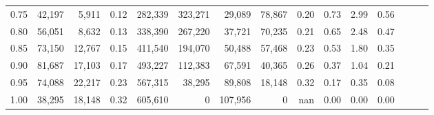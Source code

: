 \begin{tabular}{rrrrrrrrrrrrrrr}
0.75 &  42,197 &   5,911 &  0.12 &  282,339 &  323,271 &   29,089 &   78,867 &  0.20 &  0.73 &  2.99 &      0.56 \\
0.80 &  56,051 &   8,632 &  0.13 &  338,390 &  267,220 &   37,721 &   70,235 &  0.21 &  0.65 &  2.48 &      0.47 \\
0.85 &  73,150 &  12,767 &  0.15 &  411,540 &  194,070 &   50,488 &   57,468 &  0.23 &  0.53 &  1.80 &      0.35 \\
0.90 &  81,687 &  17,103 &  0.17 &  493,227 &  112,383 &   67,591 &   40,365 &  0.26 &  0.37 &  1.04 &      0.21 \\
0.95 &  74,088 &  22,217 &  0.23 &  567,315 &   38,295 &   89,808 &   18,148 &  0.32 &  0.17 &  0.35 &      0.08 \\
1.00 &  38,295 &  18,148 &  0.32 &  605,610 &        0 &  107,956 &        0 &   nan &  0.00 &  0.00 &      0.00 \\
\bottomrule
\end{tabular}
